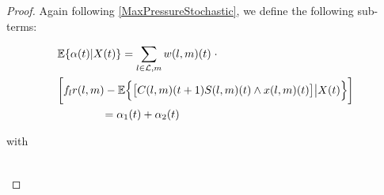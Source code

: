 \begin{proof}
Again following \eqref{MaxPressureStochastic}, we define the following sub-terms:
\begin{small}
\begin{align} \label{expected_short}
 & \mathbb{E}\{\alpha (t) | X(t)\} = \sum_{l \in \linkset,m} w(l,m)(t) \; \cdot   \\
 \nonumber  & \bigg[ f_l r(l,m) - \expectation{ \big[C(l,m)(t+1)S(l,m)(t)\wedge x(l,m)(t)\big] \big| X(t)}  \bigg]   \\  
 & \qquad \qquad = \alpha_1 (t) + \alpha_2 (t) \nonumber
\end{align}
\end{small}
with 
\begin{small}
\begin{align} \label{a1_def}

\end{align}
\end{small}
\end{proof}
